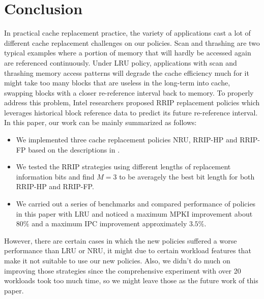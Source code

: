 \documentclass[conference]{IEEEtran}
\begin{document}




\section{Conclusion}
In practical cache replacement practice, the variety of applications cast a lot of different cache replacement challenges on our policies. Scan and thrashing are two typical examples where a portion of memory that will hardly be accessed again are referenced continuously. Under LRU policy, applications with scan and thrashing memory access patterns will degrade the cache efficiency much for it might take too many blocks that are useless in the long-term into cache, swapping blocks with a closer re-reference interval back to memory. To properly address this problem, Intel researchers proposed RRIP replacement policies which leverages historical block reference data to predict its future re-reference interval. In this paper, our work can be mainly summarized as follows:
\begin{itemize}
	\item We implemented three cache replacement policies NRU, RRIP-HP and RRIP-FP based on the descriptions in \cite{jaleel2010high}.
	\item We tested the RRIP strategies using different lengths of replacement information bits and find $M=3$ to be averagely the best bit length for both RRIP-HP and RRIP-FP.
	\item We carried out a series of benchmarks and compared performance of policies in this paper with LRU and noticed a maximum MPKI improvement about $80\%$ and a maximum IPC improvement approximately $3.5\%$.
\end{itemize}

However, there are certain cases in which the new policies suffered a worse performance than LRU or NRU, it might due to certain workload features that make it not suitable to use our new policies. Also, we didn't do much on improving those strategies since the comprehensive experiment with over 20 workloads took too much time, so we might leave those as the future work of this paper.
\end{document}
